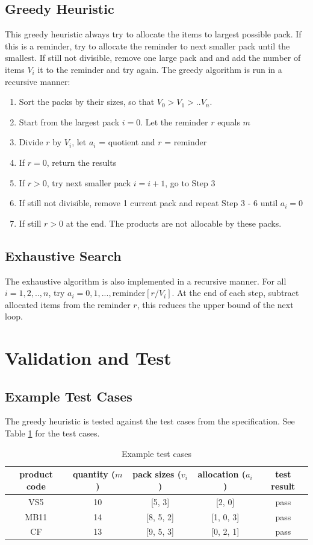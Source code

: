 \documentclass[a4paper]{article}
\begin{document}
\subsection{Greedy Heuristic}
This greedy heuristic always try to allocate the items to largest possible pack. If this is a reminder, try to allocate the reminder to next smaller pack until the smallest. If still not divisible, remove one large pack and and add the number of items $V_i$ it to the reminder and try again. The greedy algorithm is run in a recursive manner:
\begin{enumerate}
\item Sort the packs by their sizes, so that $V_0 > V_1 > .. V_n$.
\item Start from the largest pack $i=0$. Let the reminder $r$ equals $m$
\item Divide $r$ by $V_i$, let $a_i$ = quotient and $r$ = reminder
\item If $r = 0$, return the results
\item If $r > 0$, try next smaller pack $i = i + 1$, go to Step 3
\item If still not divisible, remove 1 current pack and repeat Step 3 - 6 until $a_i = 0$
\item If still $r>0$ at the end. The products are not allocable by these packs.
\end{enumerate}


\subsection{Exhaustive Search}
The exhaustive algorithm is also implemented in a recursive manner. For all $i=1, 2, .., n$, try $a_i = 0, 1, ...,\mathrm{reminder}[r/V_i]$. At the end of each step, subtract allocated items from the reminder $r$, this reduces the upper bound of the next loop.

\section{Validation and Test} 
 
\subsection{Example Test Cases}
The greedy heuristic is tested against the test cases from the specification. See Table {\ref{tab:example-test}} for the test cases.
\begin{table}
\label{tab:example-test}
 \caption{Example test cases}
 \centering
 \begin{tabular}{| c | c | c | c | c |}
 \hline
        product code & quantity ($m$) & pack sizes ($v_i$) & allocation ($a_i$) & test result\\
 \hline
 		VS5 & 10 & [5, 3] & [2, 0] & pass \\
 		MB11 & 14 & [8, 5, 2] & [1, 0, 3] & pass\\
 		CF & 13 & [9, 5, 3] & [0, 2, 1] & pass\\
  \hline
 \end{tabular}
\end{table}
\end{document}
